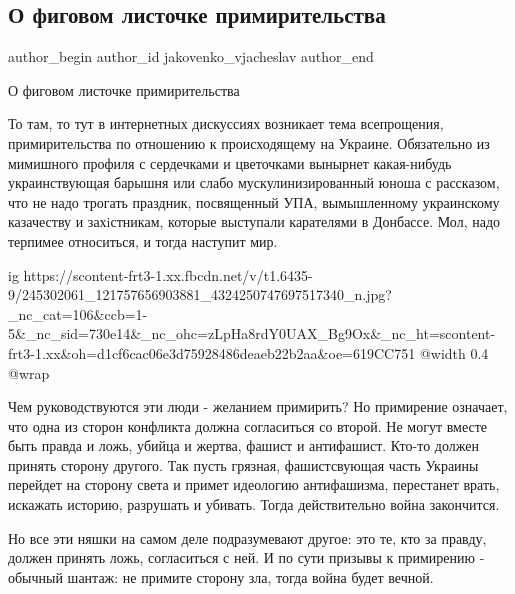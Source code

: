  
 
 
 
 
 
\subsection{О фиговом листочке примирительства}
\label{sec:14_10_2021.fb.jakovenko_vjacheslav.1.primirenie_figovyj_listok}
 
\ifcmt
 author_begin
   author_id jakovenko_vjacheslav
 author_end
\fi

О фиговом листочке примирительства

То там, то тут в интернетных дискуссиях возникает тема всепрощения,
примирительства по отношению к происходящему на Украине. Обязательно из
мимишного профиля с сердечками и цветочками вынырнет какая-нибудь
украинствующая барышня или слабо мускулинизированный юноша с рассказом, что не
надо трогать праздник, посвященный УПА, вымышленному украинскому казачеству и
захiстникам, которые выступали карателями в Донбассе. Мол, надо терпимее
относиться, и тогда наступит мир.

\ifcmt
  ig https://scontent-frt3-1.xx.fbcdn.net/v/t1.6435-9/245302061_121757656903881_4324250747697517340_n.jpg?_nc_cat=106&ccb=1-5&_nc_sid=730e14&_nc_ohc=zLpHa8rdY0UAX_Bg9Ox&_nc_ht=scontent-frt3-1.xx&oh=d1cf6cac06e3d75928486deaeb22b2aa&oe=619CC751
  @width 0.4
  @wrap 
\fi

Чем руководствуются эти люди - желанием примирить? Но примирение означает, что
одна из сторон конфликта должна согласиться со второй. Не могут вместе быть
правда и ложь, убийца и жертва, фашист и антифашист. Кто-то должен принять
сторону другого. Так пусть грязная, фашистсвующая часть Украины перейдет на
сторону света и примет идеологию антифашизма, перестанет врать, искажать
историю, разрушать и убивать. Тогда действительно война закончится.

Но все эти няшки на самом деле подразумевают другое: это те, кто за правду,
должен принять ложь, согласиться с ней. И по сути призывы к примирению -
обычный шантаж: не примите сторону зла, тогда война будет вечной.

